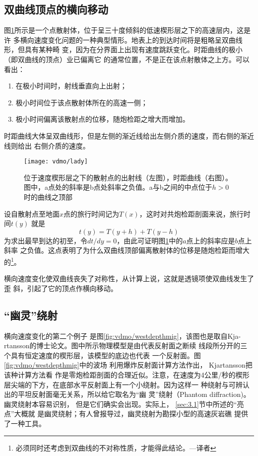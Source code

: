 \subsection{双曲线顶点的横向移动}
\label{sec:3.7.2}

图\ref{fig:vdmo/lady}所示是一个点散射体，位于呈三十度倾斜的低速楔形层之下的高速层内，这是许
多横向速度变化问题的一种典型情形。地表上的到达时间将是粗略呈双曲线形，但具有某种畸
变，因为在分界面上出现有速度跳跃变化。时距曲线的极小（即双曲线的顶点）业已偏离它
的通常位置，不是正在该点射散体之上方。可以看出：
\begin{enumerate}
  \item 在极小时间时，射线垂直向上出射；
  \item 极小时间位于该点散射体所在的高速一侧；
  \item 极小时间偏离该散射点的位移，随炮检距之增大而增加。
\end{enumerate}
时距曲线大体呈双曲线形，但是左侧的渐近线给出左侧介质的速度，而右侧的渐近线则给出
右侧介质的速度。

\begin{figure}[H]
\centering
\texttt{[image: vdmo/lady]}
\caption[lady]{位于速度楔形层之下的散射点的出射线（左图），时距曲线（右图）。
图中，a点处的斜率是b点处斜率之负值。a与b之间的中点位于$h>0$时的曲线之顶部}
\label{fig:vdmo/lady}
\end{figure}

设自散射点至地面$x$点的旅行时间记为$T(x)$，这时对共炮检距剖面来说，旅行时间$t(y)$
就是
\begin{equation*}
t(y)=T(y+h)+T(y-h)
\end{equation*}
为求出最早到达的初至，令$dt/dy=0$，由此可证明图\ref{fig:vdmo/lady}中的$a$点上的斜率应是$b$点上斜率
之负值。这点表明了为什么双曲线顶部偏离散射体的位移是随炮检距而增大的\footnote{
必须同时还考虑到双曲线的不对称性质，才能得此结论。---译者
}。

横向速度变化使双曲线丧失了对称性，从计算上说，这就是透镜项使双曲线发生了歪
斜，引起了它的顶点作横向移动。

\subsection{“幽灵”绕射}
\label{sec:3.7.3}

横向速度变化的第二个例子
是图\ref{fig:vdmo/westdepthmig}，该图也是取自Kja-
rtansson的博士论文。图中所示物理模型是由代表反射面之断续
线段所分开的三个具有恒定速度的楔形层，该模型的底边也代表
一个反射面。图\ref{fig:vdmo/westdepthmig}中的波场
利用爆炸反射面计算方法作出， Kjartansson把该种计算方法看
作是零炮检距剖面的合理近似。注意，在速度为4公里/秒的楔形
层尖端的下方，在底部水平反射面上有一个小绕射。因为这样一
种绕射与可辨认出的平坦反射面毫无关系，所以给它取名为“幽
灵”绕射（Phantom diffraction)。幽灵绕射本容易识别，
但是它们确实会出现。实际上， \ref{sec:3.1}节中所述的“亮点”大概就
是幽灵绕射；有人曾报导过，幽灵绕射为勘探小型的高速灰岩礁
提供了一种工具。

